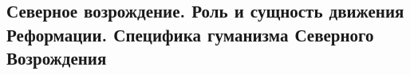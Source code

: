 \subsection{Северное возрождение. Роль и сущность движения Реформации. Специфика гуманизма Северного Возрождения}

